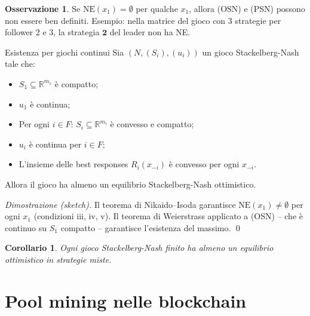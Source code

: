 \documentclass[12pt,a4paper,twoside]{book}
\theoremstyle{plain}
\newtheorem{corollary}[theorem]{Corollario}
\theoremstyle{definition}
\newtheorem{remark}[theorem]{Osservazione}
\newcommand{\NE}{\mathrm{NE}}
\begin{document}
\begin{remark}
Se $\NE(x_1)=\emptyset$ per qualche $x_1$, allora (OSN) e (PSN) possono non essere ben definiti. Esempio: nella matrice del gioco con 3 strategie per follower 2 e 3, la strategia $\mathbf{2}$ del leader non ha NE.
\end{remark}

\begin{thmbox}{Esistenza per giochi continui}
Sia $(N,(S_i),(u_i))$ un gioco Stackelberg-Nash tale che:
\begin{itemize}
  \item[(i)] $S_1\subseteq\mathbb{R}^{m_1}$ è compatto;
  \item[(ii)] $u_1$ è continua;
  \item[(iii)] Per ogni $i\in F$: $S_i\subseteq\mathbb{R}^{m_i}$ è convesso e compatto;
  \item[(iv)] $u_i$ è continua per $i\in F$;
  \item[(v)] L'insieme delle best responses $R_i(x_{-i})$ è convesso per ogni $x_{-i}$.
\end{itemize}
Allora il gioco ha almeno un equilibrio Stackelberg-Nash ottimistico.
\end{thmbox}
\textit{Dimostrazione (sketch).} Il teorema di Nikaido--Isoda garantisce $\NE(x_1)\ne\emptyset$ per ogni $x_1$ (condizioni iii, iv, v). Il teorema di Weierstrass applicato a (OSN) -- che è continuo su $S_1$ compatto -- garantisce l'esistenza del massimo. \qed

\begin{corollary}
Ogni gioco Stackelberg-Nash finito ha almeno un equilibrio ottimistico in strategie miste.
\end{corollary}

\section{Pool mining nelle blockchain}
\end{document}
